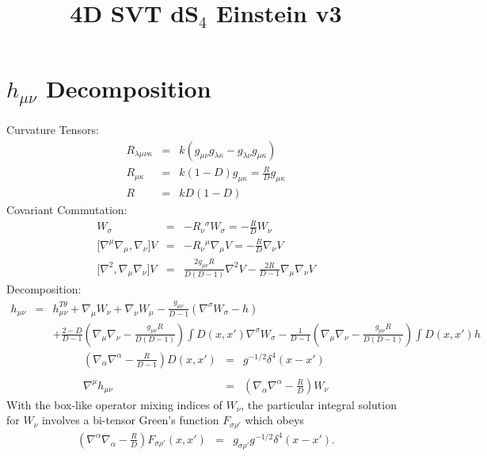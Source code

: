 \documentclass[10pt,letterpaper]{article}
\title{4D SVT dS${}_4$ Einstein v3}
\date{}
\numberwithin{equation}{section}
\begin{document}
 
\maketitle
\noindent 
\section{$h_{\mu\nu}$ Decomposition}
Curvature Tensors:
\begin{eqnarray}
R_{\lambda\mu\nu\kappa} &=& k(g_{\mu\nu}g_{\lambda\kappa}-g_{\lambda\nu}g_{\mu\kappa})
\nonumber\\
R_{\mu\kappa} &=& k(1-D)g_{\mu\kappa} = \frac{R}{D}g_{\mu\kappa}
\nonumber\\
R&=& kD(1-D) 
\end{eqnarray}
Covariant Commutation:
\begin{eqnarray}
[\nabla^\sigma \nabla_\nu] W_\sigma &=& -R_{\nu}{}^\sigma W_\sigma = -\frac{R}{D}W_\nu
\nonumber\\
{[}\nabla^\mu \nabla_\mu, \nabla_\nu] V &=& -R_{\nu}{}^\mu \nabla_\mu V = -\frac{R}{D}\nabla_\nu V
\nonumber\\
{[}\nabla^2,\nabla_\mu\nabla_\nu]V &=& \frac{2 g_{\mu\nu}R}{D(D-1)}\nabla^2 V - \frac{2R}{D-1}\nabla_\mu\nabla_\nu V
\label{comms}
\end{eqnarray}
Decomposition:
\begin{eqnarray}
h_{\mu\nu} &=& h_{\mu\nu}^{T\theta} + \nabla_\mu W_\nu + \nabla_\nu W_\mu - \frac{g_{\mu\nu}}{D-1}(\nabla^\sigma W_\sigma - h)
\nonumber\\
&& +\frac{2-D}{D-1}\left( \nabla_\mu\nabla_\nu -\frac{ g_{\mu\nu}R}{D(D-1)}\right) \int D(x,x') \nabla^\sigma W_\sigma
-\frac{1}{D-1}\left( \nabla_\mu\nabla_\nu -\frac{g_{\mu\nu}R}{D(D-1)}\right) \int D(x,x') h
\label{decomph}
\end{eqnarray}
\begin{eqnarray}
\left( \nabla_\alpha \nabla^\alpha - \frac{R}{D-1}\right)D(x,x') &=& g^{-1/2}\delta^4 (x-x')
\nonumber\\ \nonumber\\
\nabla^\mu h_{\mu\nu} &=& \left( \nabla_\alpha\nabla^\alpha-\frac{R}{D} \right) W_\nu
\end{eqnarray}
With the box-like operator mixing indices of $W_\nu$, the particular integral solution for $W_\nu$ involves a bi-tensor Green's function $F_{\sigma\rho'}$ which obeys
\begin{eqnarray}
\left( \nabla^\alpha\nabla_\alpha -\frac{R}{D}\right) F_{\sigma\rho'}(x,x') &=& g_{\sigma\rho'}g^{-1/2} \delta^4(x-x').
\label{fgreen}
\end{eqnarray}
\end{document}
